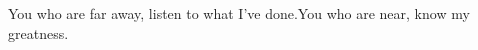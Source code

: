 
\begin{inparaenum}
  
  
  
  \pd {} You who are far away, listen to what I've done.\pa You who are near, know my greatness.%
  
\end{inparaenum}
